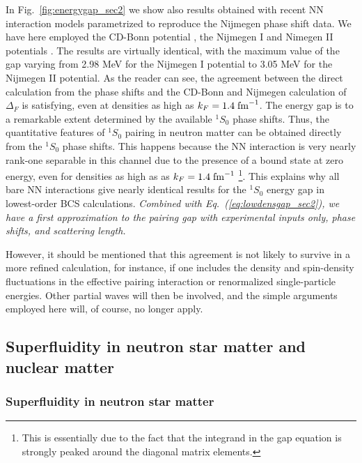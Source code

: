 \documentclass[rmp,aps,floatfix]{revtex4}
\begin{document}
In Fig.~\ref{fig:energygap_sec2} we show also results obtained
with recent NN interaction models parametrized to reproduce the
Nijmegen phase shift data. We have here employed  
the CD-Bonn potential \cite{cdbonn96},  
the Nijmegen I and Nimegen II potentials \cite{nijmegen94}. 
The results are virtually identical, with the maximum value 
of the gap varying from 2.98 MeV for the Nijmegen I potential to 3.05 MeV 
for the Nijmegen II potential.  
As the reader can see, the agreement 
between the direct calculation from the phase shifts and the CD-Bonn and
Nijmegen 
calculation of $\Delta_F$ is satisfying, even 
at densities as high as $k_F=1.4\;{\rm fm}^{-1}$.  
The energy gap 
is to a remarkable extent determined by the available $^1S_0$ phase shifts. 
Thus, the quantitative features 
of $^1S_0$ pairing in neutron matter can be obtained directly from 
the $^1S_0$ phase shifts. This happens because the NN interaction 
is very nearly rank-one separable in this channel due to the presence 
of a bound state at zero energy, even for densities as high as 
as $k_F=1.4\;{\rm fm}^{-1}$ \footnote{This is essentially due to the 
fact that the integrand in the gap equation is strongly peaked around  
the diagonal matrix elements.}. This explains why all bare NN interactions 
give nearly identical results for the $^1S_0$ energy gap in lowest-order 
BCS calculations.  {\em Combined with Eq.~(\ref{eq:lowdensgap_sec2}), we have a
first approximation to the pairing gap 
with experimental inputs only, phase shifts, and scattering length.}

However, 
it should be mentioned that this agreement 
is not likely to survive in a more refined calculation, for instance, 
if one includes the density and spin-density fluctuations in the 
effective pairing interaction or renormalized single-particle energies.
Other partial waves will then be involved, and the simple arguments 
employed here will, of course, no longer apply. 






\subsection{Superfluidity in neutron star matter and nuclear matter}
\label{subsec:NN_to_pairing_sec3}

\subsubsection{Superfluidity in neutron star matter}
\end{document}
